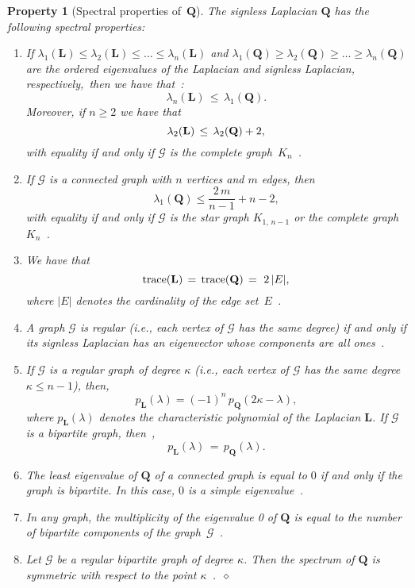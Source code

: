 \documentclass[letterpaper,9pt,twocolumn]{autart}
\newcommand{\vet}[1]{\ensuremath{{\mathbf #1}}}
\newtheorem{property}{\textbf{Property}}
\begin{document}
\begin{property}[Spectral properties of\, $\vet{Q}$]\label{Prop_Q}
The signless Laplacian $\vet{Q}$ has the following spectral 
properties:
\begin{enumerate} \item 
If $\lambda_1(\vet{L}) \leq \lambda_2(\vet{L}) \leq \ldots \leq \lambda_n(\vet{L})$ and 
$\lambda_1(\vet{Q}) \geq \lambda_2(\vet{Q}) \geq \ldots \geq \lambda_n(\vet{Q})$
are the ordered eigenvalues of the Laplacian and signless Laplacian,
respectively,~then we have that~\cite{CvetkovicRoSi_LAA07}:
$$
\lambda_n(\vet{L}) \,\leq\, \lambda_1(\vet{Q}).
$$
Moreover, if $n \geq 2$ we have that
$$
\lambda_2(\vet{L}) \,\leq\, \lambda_2(\vet{Q}) + 2,\vspace{0.05cm}
$$
with equality if and only if $\mathcal{G}$ is the complete graph~$K_n$~\cite[Th.~3.5]{CvetkovicSi_PIMB09}.

\item If $\mathcal{G}$ is a connected graph with $n$ vertices and $m$ edges, then
$$
\lambda_1(\vet{Q}) \leq \frac{2\,m}{n - 1} + n - 2,
$$ 
with equality if and only if $\mathcal{G}$ is the star graph
$K_{1,\,n-1}$ or the complete graph $K_n$~\cite[Th.~1]{CvetkovicSi_AADM10}.

\item We have that
$$
\textup{trace}(\vet{L}) \,=\, \textup{trace}(\vet{Q}) \,=\ 2\,|E|,
$$ 
where $|E|$ denotes the cardinality of the edge set~$E$~\cite{BrouwerHa_book12}. 

\item A graph $\mathcal{G}$ is \emph{regular} (i.e., each vertex
of $\mathcal{G}$ has the same degree) if and only if its
signless Laplacian has an eigenvector whose components 
are all ones~\cite[Prop.~2.1]{CvetkovicSi_PIMB09}.

\item If $\mathcal{G}$ is a \emph{regular graph} of degree $\kappa$ (i.e., each vertex
of $\mathcal{G}$ has the same degree $\kappa \leq n-1$), then,
$$
p_{\vet{L}}(\lambda) = (-1)^{n}\, p_{\vet{Q}}(2\kappa - \lambda),
$$
where $p_{\vet{L}}(\lambda)$ denotes the characteristic polynomial of the Laplacian $\vet{L}$.
If $\mathcal{G}$ is a \emph{bipartite graph}, then~\cite[Prop.~2.3]{CvetkovicRoSi_LAA07},
$$
p_{\vet{L}}(\lambda) \,=\, p_{\vet{Q}}(\lambda).
$$ 

\item The least eigenvalue of $\vet{Q}$ of a connected graph is equal to
$0$ if and only if the graph is \emph{bipartite}. In this case, $0$ is
a simple eigenvalue~\cite[Prop.~2.1]{CvetkovicRoSi_LAA07}.

\item In any graph, the multiplicity of the eigenvalue 0 of $\vet{Q}$ is equal
to the number of \emph{bipartite components} of the 
graph~$\mathcal{G}$~\cite[Prop.~1.3.9]{BrouwerHa_book12}.

\item Let $\mathcal{G}$ be a \emph{regular bipartite graph} of degree $\kappa$. Then the
spectrum of $\vet{Q}$ is symmetric with respect to the point 
$\kappa$~\cite[Prop.~2.2]{CvetkovicSi_PIMB09}.~\hfill$\diamond$ 
\end{enumerate}
\end{property}
\end{document}
